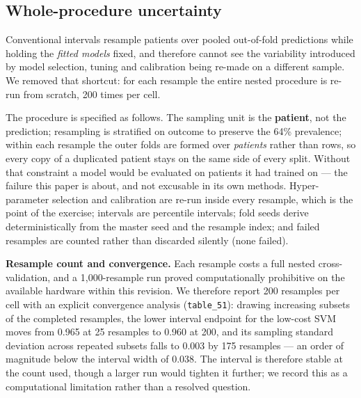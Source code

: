 \documentclass[conference]{IEEEtran}
\begin{document}
\subsection{Whole-procedure uncertainty}
\label{sec:honest}

Conventional intervals resample patients over pooled out-of-fold predictions
while holding the \emph{fitted models} fixed, and therefore cannot see the
variability introduced by model selection, tuning and calibration being
re-made on a different sample. We removed that shortcut: for each resample the
entire nested procedure is re-run from scratch, 200 times per cell.

The procedure is specified as follows. The sampling unit is the
\textbf{patient}, not the prediction; resampling is stratified on outcome to
preserve the 64\% prevalence; within each resample the outer folds are formed
over \emph{patients} rather than rows, so every copy of a duplicated patient
stays on the same side of every split. Without that constraint a model would
be evaluated on patients it had trained on --- the failure this paper is
about, and not excusable in its own methods. Hyper-parameter selection and
calibration are re-run inside every resample, which is the point of the
exercise; intervals are percentile intervals; fold seeds derive
deterministically from the master seed and the resample index; and failed
resamples are counted rather than discarded silently (none failed).

\textbf{Resample count and convergence.} Each resample costs a full nested
cross-validation, and a 1{,}000-resample run proved computationally
prohibitive on the available hardware within this revision. We therefore
report 200 resamples per cell with an explicit convergence analysis
(\texttt{table\_51}): drawing increasing subsets of the completed resamples,
the lower interval endpoint for the low-cost SVM moves from 0.965 at 25
resamples to 0.960 at 200, and its sampling standard deviation across
repeated subsets falls to 0.003 by 175 resamples --- an order of magnitude
below the interval width of 0.038. The interval is therefore stable at the
count used, though a larger run would tighten it further; we record this as a
computational limitation rather than a resolved question.
\end{document}
